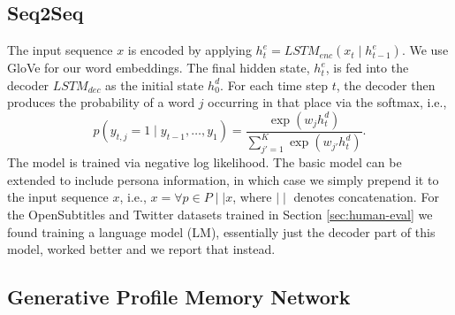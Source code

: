 \documentclass[11pt,a4paper]{article}
\begin{document}
\subsection{Seq2Seq}

The input sequence $x$ is encoded by applying $h^e_t = LSTM_{enc}(x_t \mid h^e_{t-1})$. We use GloVe \citep{pennington2014glove} for our word embeddings. The final hidden state, $h^e_t$, is fed into the decoder $LSTM_{dec}$ as the initial state $h^d_0$. For each time step $t$, the decoder then produces the probability of a word $j$ occurring in that place via the softmax, i.e.,
\begin{equation*}
p(y_{t,j} = 1 \mid y_{t-1}, \ldots, y_1) = \frac{\exp (w_j h^d_t)}{\sum^K_{j'=1} \exp (w_{j'} h^d_t)}.
\end{equation*}
The model is trained via negative log likelihood. The basic model can be extended to include persona information, in which case we simply prepend it to the input sequence $x$, i.e., $x =  \forall p \in P \mid\mid x$, where $\mid\mid$ denotes concatenation.
For the OpenSubtitles and Twitter datasets trained in Section \ref{sec:human-eval} we found training a language model (LM), essentially just the decoder part of this model, worked better and we report that instead.


\subsection{Generative Profile Memory Network}
\end{document}
